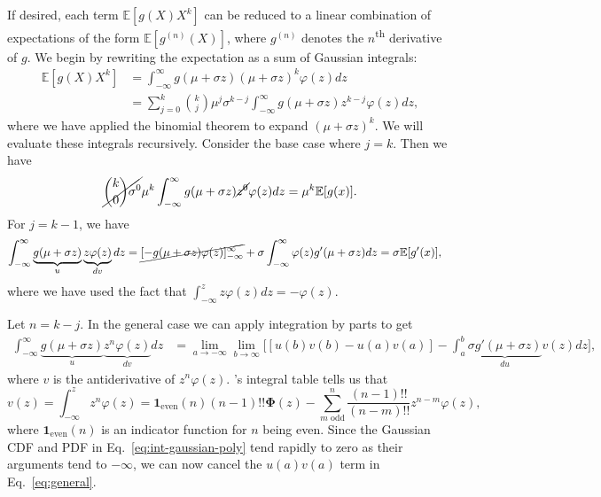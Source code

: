 \documentclass{article}
\theoremstyle{plain}
\theoremstyle{definition}
\theoremstyle{remark}
\newcommand{\Pphi}{\boldsymbol{\Phi}}
\newcommand{\E}{\mathbb{E}}
\begin{document}
If desired, each term $\E [ g(X) X^k ]$ can be reduced to a linear combination of expectations of the form $\E [ g^{(n)}(X) ]$, where $g^{(n)}$ denotes the $n$\textsuperscript{th} derivative of $g$. We begin by rewriting the expectation as a sum of Gaussian integrals:
\begin{align}
    \E[g(X) X^k] &= \int_{-\infty}^{\infty} g(\mu + \sigma z) (\mu + \sigma z)^k \varphi (z) dz \\
    &= \sum_{j = 0}^k \binom{k}{j} \mu^j \sigma^{k - j} \int_{-\infty}^{\infty} g(\mu + \sigma z) z^{k - j} \varphi(z) dz,
\end{align}
where we have applied the binomial theorem to expand $(\mu + \sigma z)^k$. We will evaluate these integrals recursively. Consider the base case where $j = k$. Then we have
\begin{equation}\label{eq:zeroth-order}
    \cancel{\binom{k}{0}\sigma^0} \mu^k \int_{-\infty}^{\infty} g(\mu + \sigma z) \cancel{z^0} \varphi(z) dz = \mu^k \E [ g(x) ].
\end{equation}
For $j = k - 1$, we have
\begin{align}\label{eq:first-order}
    \int_{-\infty}^{\infty} \underbrace{g(\mu + \sigma z)}_{u} \underbrace{z \varphi(z)}_{dv} dz &= \cancel{[-g(\mu + \sigma z) \varphi(z)]_{-\infty}^{\infty}} + \sigma \int_{-\infty}^{\infty} \varphi(z) g'(\mu + \sigma z) dz = \sigma \E[g'(x)],
\end{align}
where we have used the fact that $\int_{-\infty}^{z} z \varphi(z) dz = -\varphi(z)$.

Let $n = k - j$. In the general case we can apply integration by parts to get
\begin{align}\label{eq:general}
    \int_{-\infty}^{\infty} \underbrace{g(\mu + \sigma z)}_{u} \underbrace{z^n \varphi(z)}_{dv} dz &= \lim_{a \rightarrow -\infty} \lim_{b \rightarrow \infty} \Big [ [u(b) v(b) - u(a) v(a)] - \int_{a}^{b} \underbrace{\sigma g'(\mu + \sigma z)}_{du} v(z) dz \Big ],
\end{align}
where $v$ is the antiderivative of $z^n \varphi(z)$. \citet{owen1980table}'s integral table tells us that
\begin{equation}\label{eq:int-gaussian-poly}
    v(z) = \int_{-\infty}^{z} z^n \varphi(z) = \mathbf{1}_{\text{even}}(n) (n - 1)!! \Pphi(z) - \sum_{m\text{ odd}}^n \frac{(n - 1)!!}{(n - m)!!} z^{n - m} \varphi(z),
\end{equation}
where $\mathbf{1}_{\text{even}}(n)$ is an indicator function for $n$ being even. Since the Gaussian CDF and PDF in Eq.~\ref{eq:int-gaussian-poly} tend rapidly to zero as their arguments tend to $-\infty$, we can now cancel the $u(a)v(a)$ term in Eq.~\ref{eq:general}.
\end{document}
